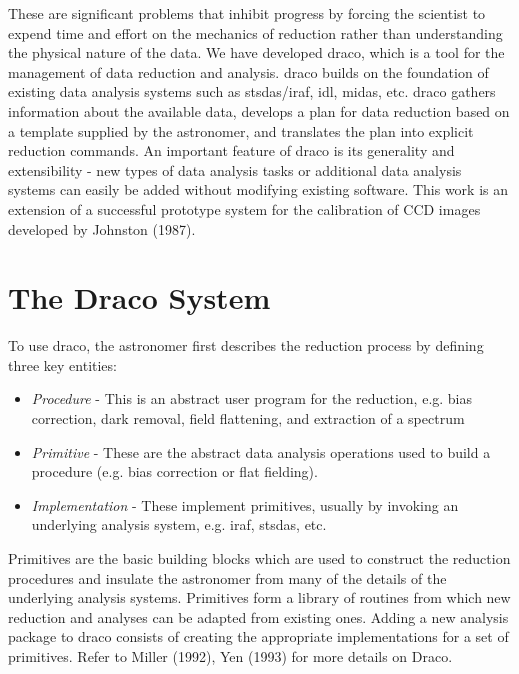 These are significant problems that inhibit progress by forcing the 
scientist to expend time and effort on the mechanics of reduction rather 
than understanding the physical nature of the data. We have developed {\sc 
draco}, which is a tool for the management of data reduction and analysis. 
{\sc draco} builds on the foundation of existing data analysis systems such 
as {\sc stsdas/iraf, idl, midas,} etc. {\sc draco} gathers information 
about the available data, develops a plan for data reduction based on a 
template supplied by the astronomer, and translates the plan into explicit 
reduction commands. An important feature of {\sc draco} is its generality 
and extensibility - new types of data analysis tasks or additional data 
analysis systems can easily be added without modifying existing software. 
This work is an extension of a successful prototype system for the 
calibration of CCD images developed by Johnston (1987). 

\section{The Draco System}

To use {\sc draco}, the astronomer first describes the reduction process by 
defining three key entities:
\begin{itemize}

 \item {\it Procedure} - This is an abstract user program for the 
reduction, e.g. bias correction, dark removal, field flattening, and 
extraction of a spectrum
	
	\item  {\it Primitive} - These are the abstract data analysis operations 
	used to build a procedure (e.g. bias correction or flat fielding).
	
	\item  {\it Implementation} - These implement primitives, usually by 
	invoking an underlying analysis system, e.g. {\sc iraf, stsdas}, etc.
			
\end{itemize}

Primitives are the basic building blocks which are used to construct the 
reduction procedures and insulate the astronomer from many of the details 
of the underlying analysis systems. Primitives form a library of routines 
from which new reduction and analyses can be adapted from existing ones. 
Adding a new analysis package to {\sc draco} consists of creating the 
appropriate implementations for a set of primitives. Refer to Miller 
(1992), Yen (1993) for more details on Draco.


